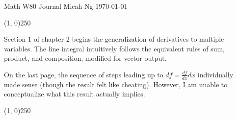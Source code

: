 \documentclass[11pt,letterpaper]{article}
\begin{document}
\noindent
Math W80 Journal \hfill Micah Ng \hfill \today

\begin{center}
\line(1, 0){250}
\end{center}

Section 1 of chapter 2 begins the generalization of derivatives to multiple
variables. The line integral intuitively follows the equivalent rules of sum,
product, and composition, modified for vector output.

On the last page, the sequence of steps leading up to $df=\frac{df}{dx}dx$
individually made sense (though the result felt like cheating). However, I am
unable to conceptualize what this result actually implies.

\begin{center}
\line(1, 0){250}
\end{center}
\end{document}
